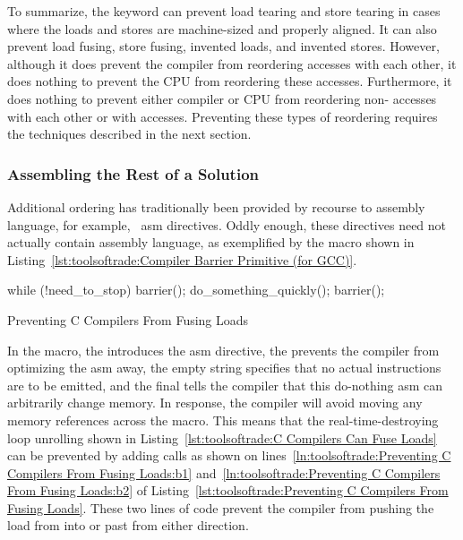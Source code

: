 To summarize, the  keyword can prevent load
tearing and store tearing in cases where the loads and stores are
machine-sized and properly aligned.
It can also prevent load fusing, store fusing, invented loads, and
invented stores.
However, although it does prevent the compiler from reordering 
accesses with each other, it does nothing to prevent the
CPU from reordering these accesses.
Furthermore, it does nothing to prevent either compiler or CPU from
reordering non- accesses with each other or with
 accesses.
Preventing these types of reordering requires the techniques described
in the next section.

\subsubsection{Assembling the Rest of a Solution}
\label{sec:toolsoftrade:Assembling the Rest of a Solution}

Additional ordering has traditionally been provided by recourse to
assembly language, for example, \GCC\ asm directives.
Oddly enough, these directives need not actually contain assembly language,
as exemplified by the  macro shown in
Listing~\ref{lst:toolsoftrade:Compiler Barrier Primitive (for GCC)}.

\begin{listing}[tbp]
\begin{fcvlabel}
\begin{VerbatimL}[commandchars=\\\[\]]
while (!need_to_stop) {
	barrier(); \lnlbl[b1]
	do_something_quickly();
	barrier(); \lnlbl[b2]
}
\end{VerbatimL}
\end{fcvlabel}
\caption{Preventing C Compilers From Fusing Loads}
\label{lst:toolsoftrade:Preventing C Compilers From Fusing Loads}
\end{listing}

In the  macro, the  introduces the asm
directive, the  prevents the compiler from optimizing
the asm away, the empty string specifies that no actual instructions
are to be emitted, and the final  tells the compiler that
this do-nothing asm can arbitrarily change memory.
In response, the compiler will avoid moving any memory references across
the  macro.
This means that the real-time-destroying loop unrolling shown in
Listing~\ref{lst:toolsoftrade:C Compilers Can Fuse Loads}
can be prevented by adding  calls as shown on
lines~\ref{ln:toolsoftrade:Preventing C Compilers From Fusing Loads:b1}
and~\ref{ln:toolsoftrade:Preventing C Compilers From Fusing Loads:b2}
of
Listing~\ref{lst:toolsoftrade:Preventing C Compilers From Fusing Loads}.
These two lines of code prevent the compiler from pushing the load from
 into or past  from either
direction.

